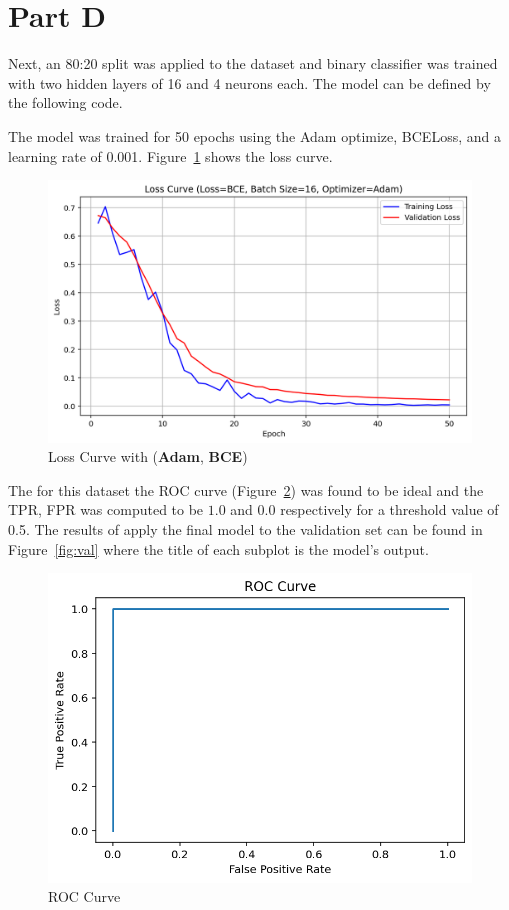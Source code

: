 \newpage
\section{Part D}
\label{sec:sec_d}
Next, an 80:20 split was applied to the dataset and binary classifier was trained with two hidden layers of 16 and 4 neurons each. The model can be defined by the following code. 


The model was trained for 50 epochs using the Adam optimize, BCELoss, and a learning rate of 0.001. Figure~\ref{fig:loss} shows the loss curve.

\begin{figure}[htpb]
	\centering
	\includegraphics[width=\columnwidth]{figures/loss.png}
	\caption{Loss Curve with (\textbf{Adam}, \textbf{BCE})}
	\label{fig:loss}
\end{figure}

The for this dataset the ROC curve (Figure~\ref{fig:roc}) was found to be ideal and the TPR, FPR was computed to be $1.0$ and $0.0$ respectively for a threshold value of 0.5. The results of apply the final model to the validation set can be found in Figure~\ref{fig:val} where the title of each subplot is the model's output. 

\begin{figure}[htpb]
	\centering
	\includegraphics[width=\columnwidth]{figures/holdout.png}
	\caption{ROC Curve}
	\label{fig:roc}
\end{figure}

